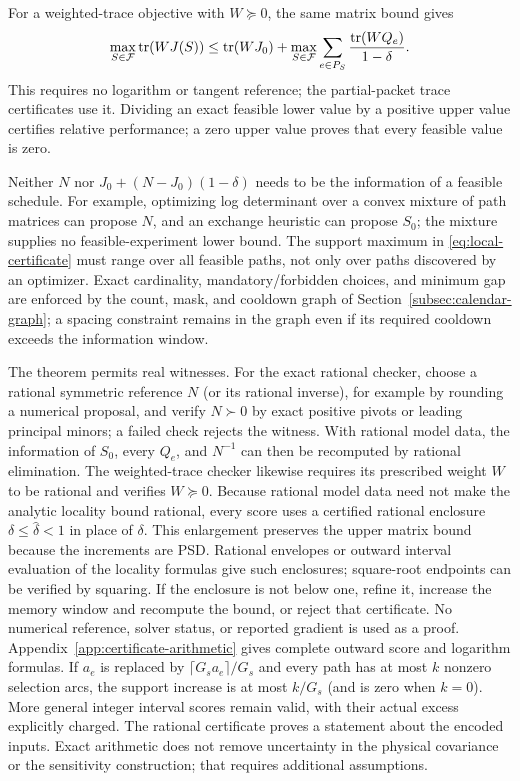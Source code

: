 For a weighted-trace objective with $W\succeq0$, the same matrix bound gives
\[
 \max_{S\in\mathcal F}\operatorname{tr}(WJ(S))\le \operatorname{tr}(WJ_0)
 +\max_{S\in\mathcal F}\sum_{e\in P_S}\frac{\operatorname{tr}(WQ_e)}{1-\delta}.
\]
This requires no logarithm or tangent reference; the partial-packet trace
certificates use it. Dividing an exact feasible lower
value by a positive upper value certifies relative performance; a zero upper
value proves that every feasible value is zero.

Neither $N$ nor $J_0+(N-J_0)(1-\delta)$ needs to be the information of a
feasible schedule. For example, optimizing log determinant over a convex
mixture of path matrices can propose $N$, and an exchange heuristic can
propose $S_0$; the mixture supplies no feasible-experiment lower bound. The
support maximum in \eqref{eq:local-certificate} must range over all feasible
paths, not only over paths discovered by an optimizer. Exact cardinality,
mandatory/forbidden choices, and minimum gap are enforced by the count, mask,
and cooldown graph of Section~\ref{subsec:calendar-graph}; a spacing
constraint remains in the graph even if its required cooldown exceeds the
information window.

The theorem permits real witnesses. For the exact rational checker, choose
a rational symmetric reference $N$ (or its rational inverse), for example by
rounding a numerical proposal, and verify $N\succ0$ by exact positive pivots
or leading principal minors; a failed check rejects the witness. With rational
model data, the information of $S_0$, every $Q_e$, and $N^{-1}$ can then be
recomputed by rational elimination. The weighted-trace checker likewise
requires its prescribed weight $W$ to be rational and verifies $W\succeq0$.
Because rational model data need not make the analytic locality bound
rational, every score uses a certified rational enclosure
$\delta\le\widehat\delta<1$ in place of $\delta$. This enlargement preserves
the upper matrix bound because the increments are PSD. Rational envelopes or
outward interval evaluation of the locality formulas give such enclosures;
square-root endpoints can be verified by squaring. If the enclosure is not
below one, refine it, increase the memory window and recompute the bound, or
reject that certificate.
No numerical reference, solver status, or reported gradient is used as a
proof. Appendix~\ref{app:certificate-arithmetic} gives complete outward score
and logarithm formulas. If $a_e$ is replaced by
$\lceil G_s a_e\rceil/G_s$ and every path has at most $k$ nonzero selection
arcs, the support increase is at most $k/G_s$ (and is zero when $k=0$).
More general integer interval scores remain valid, with their actual excess
explicitly charged. The rational certificate proves a statement about the
encoded inputs. Exact arithmetic does not remove uncertainty in the physical
covariance or the sensitivity construction; that requires additional
assumptions.

